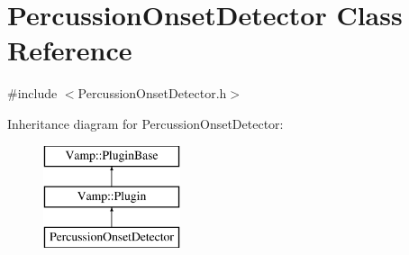 \hypertarget{class_percussion_onset_detector}{}\section{Percussion\+Onset\+Detector Class Reference}
\label{class_percussion_onset_detector}


{\ttfamily \#include $<$Percussion\+Onset\+Detector.\+h$>$}

Inheritance diagram for Percussion\+Onset\+Detector\+:\begin{figure}[H]
\begin{center}
\leavevmode
\includegraphics[height=3.000000cm]{class_percussion_onset_detector}
\end{center}
\end{figure}
